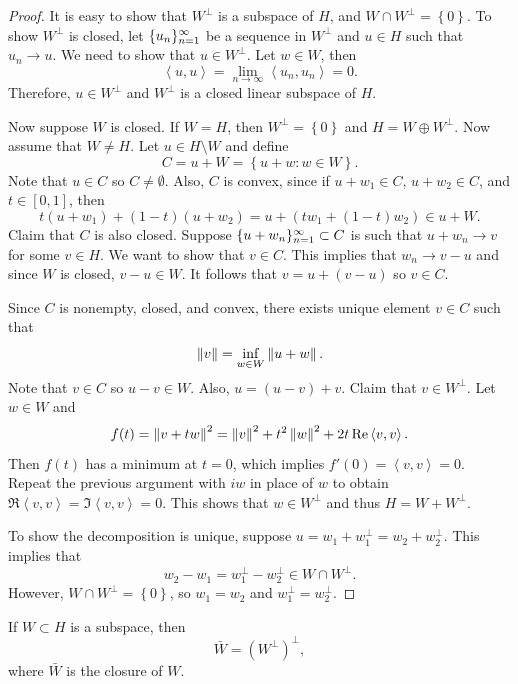 \documentclass[a4paper]{article}
\renewcommand{\braket}[2]{\left\langle #1, #1 \right\rangle}
\begin{document}
\begin{proof}
  It is easy to show that $W^\perp$ is a subspace of $H$,
  and $W \cap W^\perp = \left\{ 0 \right\}$.
  To show $W^\perp$ is closed, let $\{ u_n \}_{n=1}^\infty$
  be a sequence in $W^\perp$ and $u \in H$ such that
  $u_n \to u$. We need to show that $u \in W^\perp$.
  Let $w \in W$, then
  \[
    \braket{u}{w} = \lim_{n \to \infty} \braket{u_n}{w}
    = 0.
  \]
  Therefore, $u \in W^\perp$ and $W^\perp$ is a closed
  linear subspace of $H$.

  Now suppose $W$ is closed. If $W = H$, then
  $W^\perp = \left\{ 0 \right\}$ and $H = W \oplus W^\perp$.
  Now assume that $W \neq H$. Let $u \in H \setminus W$
  and define
  \[
    C = u + W = \left\{ u + w : w \in W \right\}.
  \]
  Note that $u \in C$ so $C \neq \emptyset$. Also,
  $C$ is convex, since if $u + w_1 \in C$,
  $u + w_2 \in C$, and $t \in [0, 1]$, then
  \[
    t(u + w_1) + (1 - t)(u + w_2) =
    u + (t w_1 + (1-t) w_2) \in u + W.
  \]
  Claim that $C$ is also closed. Suppose $\{ u + w_n \}_{n=1}^\infty
    \subset C$ is such that $u + w_n \to v$ for some
  $v \in H$. We want to show that $v \in C$. This implies that
  $w_n \to v - u$ and since $W$ is closed, $v - u \in W$.
  It follows that $v = u + (v - u)$ so $v \in C$.

  Since $C$ is nonempty, closed, and convex, there exists
  unique element $v \in C$ such that
  \[
    \left\lVert v\right\rVert = \inf_{w \in W} \left\lVert u + w\right\rVert.
  \]
  Note that $v \in C$ so $u - v \in W$. Also,
  $u = (u - v) + v$. Claim that $v \in W^\perp$.
  Let $w \in W$ and
  \[
    f(t) = \norm{v + t w}^2 =
    \norm{v}^2 + t^2 \norm{w}^2 + 2 t \Re \braket{v}{w}.
  \]
  Then $f(t)$ has a minimum at $t = 0$, which implies
  $f'(0) = \braket{v}{w} = 0$. Repeat the previous
  argument with $iw$ in place of $w$ to obtain
  $\Re \braket{v}{iw} = \Im \braket{v}{w} = 0$.
  This shows that $w \in W^\perp$ and thus
  $H = W + W^\perp$.

  To show the decomposition is unique, suppose
  $u = w_1 + w_1^\perp = w_2 + w_2^\perp$. This implies
  that
  \[
    w_2 - w_1 = w_1^\perp - w_2^\perp \in W \cap W^\perp.
  \]
  However, $W \cap W^\perp = \left\{ 0 \right\}$, so
  $w_1 = w_2$ and $w_1^\perp = w_2^\perp$.
\end{proof}

\begin{thm}
  If $W \subset H$ is a subspace, then
  \[
    \bar{W} = \left( W^\perp \right)^\perp,
  \]
  where $\bar{W}$ is the closure of $W$.
\end{thm}
\end{document}
